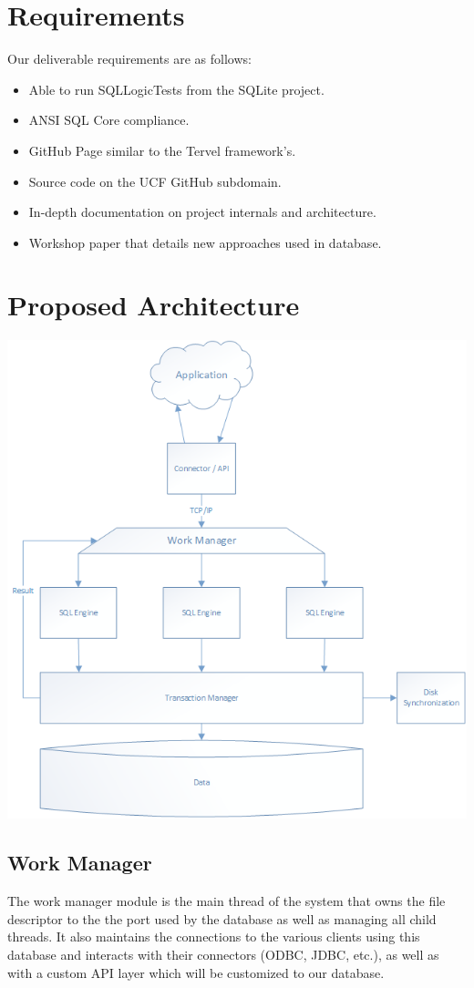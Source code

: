 \documentclass[letterpaper]{article}
\begin{document}
  \section{Requirements}
  Our deliverable requirements are as follows:
  \begin{itemize}
   \item Able to run SQLLogicTests from the SQLite project.
   \item ANSI SQL Core compliance.
   \item GitHub Page similar to the Tervel framework's.
   \item Source code on the UCF GitHub subdomain.
   \item In-depth documentation on project internals and architecture.
   \item Workshop paper that details new approaches used in database.
  \end{itemize}
  
  \section{Proposed Architecture}
  \includegraphics[scale=.70]{OpenMemDbDiagram.png}
  \subsection{Work Manager}
  The work manager module is the main thread of the system that owns the file descriptor to the the port used by the database as well as managing
  all child threads. It also maintains the connections to the various clients using this database and interacts with their connectors (ODBC, JDBC, etc.),
  as well as with a custom API layer which will be customized
   to our database.
  
\end{document}
